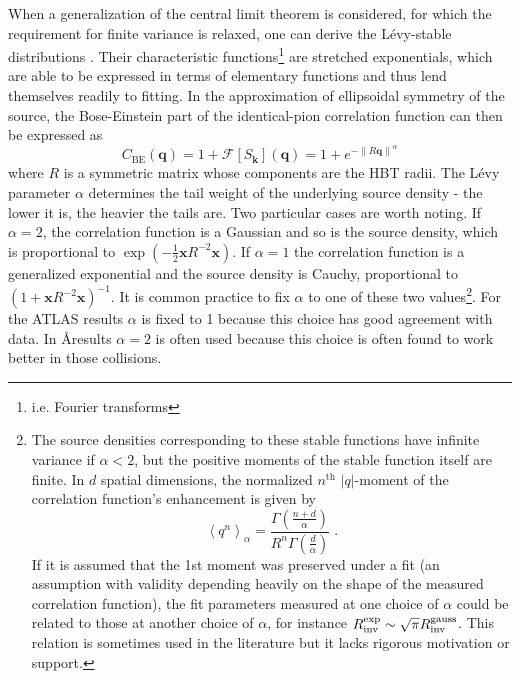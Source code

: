 When a generalization of the central limit theorem is considered, for which the requirement for finite variance is relaxed, one can derive the L\'evy-stable distributions \cite{Csorgo:2003uv}.
Their characteristic functions\footnote{i.e. Fourier transforms} are stretched exponentials, which are able to be expressed in terms of elementary functions and thus lend themselves readily to fitting.
In the approximation of ellipsoidal symmetry of the source, the Bose-Einstein part of the identical-pion correlation function can then be expressed as
\begin{equation} C_{\textrm{BE}}(\mathbf{q}) = 1 + \mathcal{F}[S_\mathbf{k}](\mathbf{q}) = 1 + e^{- \left\lVert R \mathbf{q} \right\rVert^{\alpha} } \end{equation}
where $R$ is a symmetric matrix whose components are the \ac{HBT} radii.
The L\'evy parameter $\alpha$ determines the tail weight of the underlying source density - the lower it is, the heavier the tails are.
Two particular cases are worth noting.
If $\alpha = 2$, the correlation function is a Gaussian and so is the source density, which is proportional to \( \exp\left(-\frac{1}{2} \mathbf{x} R^{-2} \mathbf{x}\right) \).
If $\alpha = 1$ the correlation function is a generalized exponential and the source density is Cauchy, proportional to \( \left( 1 + \mathbf{x} R^{-2} \mathbf{x} \right)^{-1} \).
It is common practice to fix $\alpha$ to one of these two values\footnote{The source densities corresponding to these stable functions have infinite variance if $\alpha < 2$, but the positive moments of the stable function itself are finite.
In $d$ spatial dimensions, the normalized $n^\textrm{th}$ $|q|$-moment of the correlation function's enhancement is given by
\begin{equation}
\left< q^n \right>_{\alpha} = \frac{\Gamma\left(\frac{n+d}{\alpha}\right)}{R^n \Gamma\left(\frac{d}{\alpha}\right)} \; .
\end{equation}
If it is assumed that the 1st moment was preserved under a fit (an assumption with validity depending heavily on the shape of the measured correlation function), the fit parameters measured at one choice of $\alpha$ could be related to those at another choice of $\alpha$, for instance $R_{\mathrm{inv}}^{\textrm{exp}} \sim \sqrt{\pi} R_{\mathrm{inv}}^{\textrm{gauss}}$.
This relation is sometimes used in the literature but it lacks rigorous motivation or support.}.
For the ATLAS \pPb results $\alpha$ is fixed to 1 because this choice has good agreement with data.
In \AA results $\alpha = 2$ is often used because this choice is often found to work better in those collisions.

